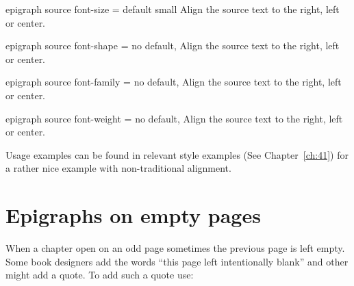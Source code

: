 \begin{docKey}[phd]{ epigraph source font-size}{ =  } {default small }
Align the source text to the right, left or center.
\end{docKey}

\begin{docKey}[phd]{ epigraph source font-shape}{ = }{no default, }
Align the source text to the right, left or center.
\end{docKey}

\begin{docKey}[phd]{ epigraph source font-family}{ = }{no default, }
Align the source text to the right, left or center.
\end{docKey}


\begin{docKey}[phd]{epigraph source font-weight}{ = }{no default, }
Align the source text to the right, left or center.
\end{docKey}


Usage examples can be found in relevant style examples (See Chapter~\ref{ch:41}) for a rather 
nice example with non-traditional alignment.

\section{Epigraphs on empty pages}

When a chapter open on an odd page sometimes the  previous page is left empty. Some book designers 
add the words ``this page left intentionally blank'' and other might add a quote. To add such a quote use:


\endinput

